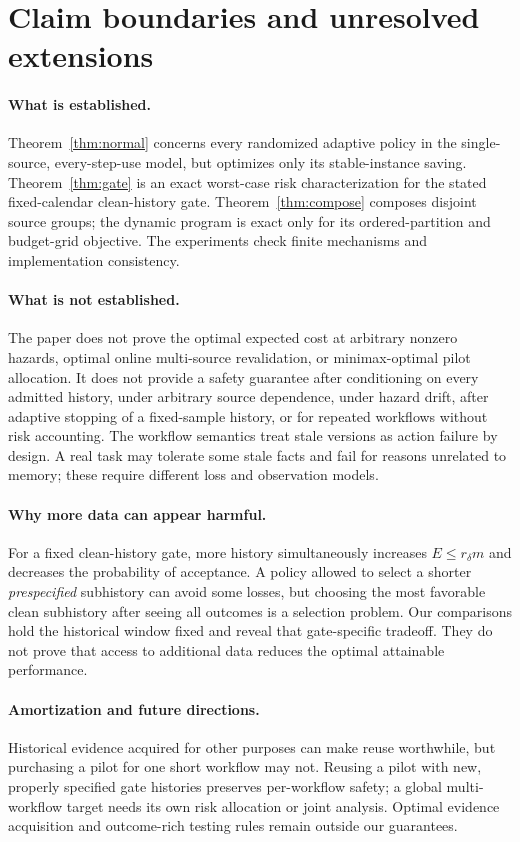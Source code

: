 \section{Claim boundaries and unresolved extensions}\label{app:boundaries}
\paragraph{What is established.}
Theorem~\ref{thm:normal} concerns every randomized adaptive policy in the single-source, every-step-use model, but optimizes only its stable-instance saving. Theorem~\ref{thm:gate} is an exact worst-case risk characterization for the stated fixed-calendar clean-history gate. Theorem~\ref{thm:compose} composes disjoint source groups; the dynamic program is exact only for its ordered-partition and budget-grid objective. The experiments check finite mechanisms and implementation consistency.

\paragraph{What is not established.}
The paper does not prove the optimal expected cost at arbitrary nonzero hazards, optimal online multi-source revalidation, or minimax-optimal pilot allocation. It does not provide a safety guarantee after conditioning on every admitted history, under arbitrary source dependence, under hazard drift, after adaptive stopping of a fixed-sample history, or for repeated workflows without risk accounting. The workflow semantics treat stale versions as action failure by design. A real task may tolerate some stale facts and fail for reasons unrelated to memory; these require different loss and observation models.

\paragraph{Why more data can appear harmful.}
For a fixed clean-history gate, more history simultaneously increases $E\leq r_\delta m$ and decreases the probability of acceptance. A policy allowed to select a shorter \emph{prespecified} subhistory can avoid some losses, but choosing the most favorable clean subhistory after seeing all outcomes is a selection problem. Our comparisons hold the historical window fixed and reveal that gate-specific tradeoff. They do not prove that access to additional data reduces the optimal attainable performance.

\paragraph{Amortization and future directions.}
Historical evidence acquired for other purposes can make reuse worthwhile, but purchasing a pilot for one short workflow may not. Reusing a pilot with new, properly specified gate histories preserves per-workflow safety; a global multi-workflow target needs its own risk allocation or joint analysis. Optimal evidence acquisition and outcome-rich testing rules remain outside our guarantees.
